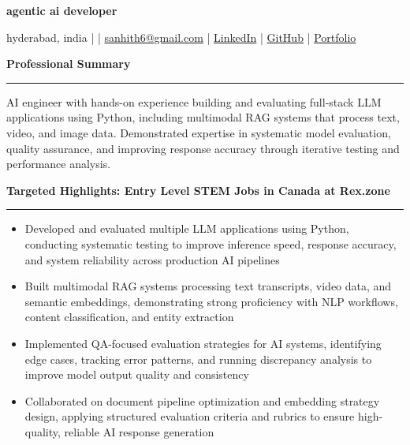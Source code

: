 \documentclass[9pt, letterpaper]{article}
\newcommand{\name}[1]{%
    \begin{center}
        {\LARGE \textbf{#1}}
    \end{center}
}
\newcommand{\sectionheading}[1]{%
    \vspace{4pt}%
    {\large \textbf{#1}}%
    \vspace{1pt}%
    \hrule
    \vspace{2pt}%
}
\begin{document}
\name{agentic ai developer}
\begin{center}
    hyderabad, india \quad |  \quad | \quad
    \href{mailto:sanhith6@gmail.com}{sanhith6@gmail.com} \quad | \quad
    \href{https://www.linkedin.com/in/sanhith-reddy-740a1625b/}{LinkedIn} \quad | \quad
    \href{https://github.com/tsanhith}{GitHub} \quad | \quad
    \href{https://johndoe.dev}{Portfolio}
\end{center}

\vspace{0pt}

\sectionheading{Professional Summary}
AI engineer with hands-on experience building and evaluating full-stack LLM applications using Python, including multimodal RAG systems that process text, video, and image data. Demonstrated expertise in systematic model evaluation, quality assurance, and improving response accuracy through iterative testing and performance analysis.

\sectionheading{Targeted Highlights: Entry Level STEM Jobs in Canada at Rex.zone}
\begin{itemize}[leftmargin=0.25in, itemindent=-0.15in, label={--}]
    \item Developed and evaluated multiple LLM applications using Python, conducting systematic testing to improve inference speed, response accuracy, and system reliability across production AI pipelines
    \item Built multimodal RAG systems processing text transcripts, video data, and semantic embeddings, demonstrating strong proficiency with NLP workflows, content classification, and entity extraction
    \item Implemented QA-focused evaluation strategies for AI systems, identifying edge cases, tracking error patterns, and running discrepancy analysis to improve model output quality and consistency
    \item Collaborated on document pipeline optimization and embedding strategy design, applying structured evaluation criteria and rubrics to ensure high-quality, reliable AI response generation
\end{itemize}
\end{document}
